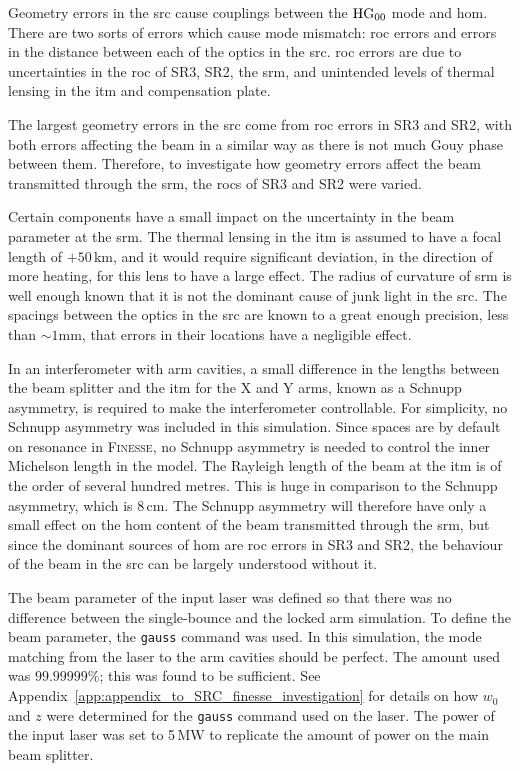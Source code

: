 \par
Geometry errors in the \gls{src} cause couplings between the $\rm{HG}_{00}$ mode and \gls{hom}. There are two sorts of errors which cause mode mismatch: \gls{roc} errors and errors in the distance between each of the optics in the \gls{src}. \gls{roc} errors are due to uncertainties in the \gls{roc} of SR3, SR2, the \gls{srm}, and unintended levels of thermal lensing in the \gls{itm} and compensation plate. 
\par
The largest geometry errors in the \gls{src} come from \gls{roc} errors in SR3 and SR2, with both errors affecting the beam in a similar way as there is not much Gouy phase between them. Therefore, to investigate how geometry errors affect the beam transmitted through the \gls{srm}, the \glspl{roc} of SR3 and SR2 were varied.
\par
Certain components have a small impact on the uncertainty in the beam parameter at the \gls{srm}. The thermal lensing in the \gls{itm} is assumed to have a focal length of $+50$\,km, and it would require significant deviation, in the direction of more heating, for this lens to have a large effect. The radius of curvature of \gls{srm} is well enough known that it is not the dominant cause of junk light in the \gls{src}. The spacings between the optics in the \gls{src} are known to a great enough precision, less than $\sim\!1\si{\milli\metre}$, that errors in their locations have a negligible effect.
\par
In an interferometer with arm cavities, a small difference in the lengths between the beam splitter and the \gls{itm} for the X and Y arms, known as a Schnupp asymmetry, is required to make the interferometer controllable. For simplicity, no Schnupp asymmetry was included in this simulation. Since spaces are by default on resonance in \textsc{Finesse}, no Schnupp asymmetry is needed to control the inner Michelson length in the model. The Rayleigh length of the beam at the \gls{itm} is of the order of several hundred metres. This is huge in comparison to the Schnupp asymmetry, which is 8\,cm. The Schnupp asymmetry will therefore have only a small effect on the \gls{hom} content of the beam transmitted through the \gls{srm}, but since the dominant sources of \gls{hom} are \gls{roc} errors in SR3 and SR2, the behaviour of the beam in the \gls{src} can be largely understood without it.
\par
The beam parameter of the input laser was defined so that there was no difference between the single-bounce and the locked arm simulation. To define the beam parameter, the \texttt{gauss} command was used. In this simulation, the mode matching from the laser to the arm cavities should be perfect. The amount used was $99.99999\%$; this was found to be sufficient. See Appendix~\ref{app:appendix_to_SRC_finesse_investigation} for details on how $w_0$ and $z$ were determined for the \texttt{gauss} command used on the laser. The power of the input laser was set to 5\,MW to replicate the amount of power on the main beam splitter.
